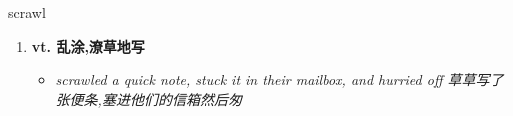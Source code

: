 
\begin{frame}
{\huge scrawl}
\begin{center}
\begin{enumerate}\Large
  \item \textbf{vt. 乱涂,潦草地写}
  \begin{itemize}
    \item \em{\Large{scrawled a quick note, stuck it in their mailbox, and hurried off 草草写了张便条,塞进他们的信箱然后匆}}
  \end{itemize}
\end{enumerate}
\end{center}
\end{frame}
